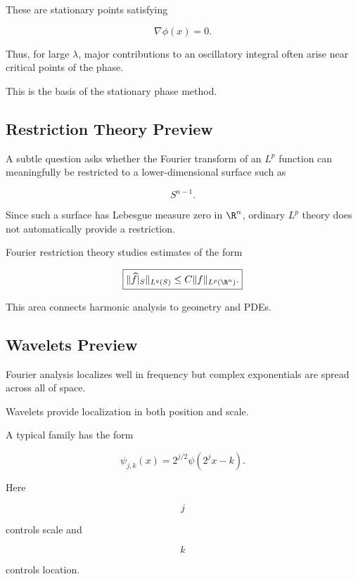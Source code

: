 These are stationary points satisfying

\[
\boxed{
\nabla\phi(x)=0.
}
\]

Thus, for large \(\lambda\), major contributions to an oscillatory
integral often arise near critical points of the phase.

This is the basis of the stationary phase method.

\subsection{Restriction Theory Preview}
\label{subsec:restriction-theory-preview}

A subtle question asks whether the Fourier transform of an \(L^p\)
function can meaningfully be restricted to a lower-dimensional surface
such as

\[
\boxed{
S^{n-1}.
}
\]

Since such a surface has Lebesgue measure zero in \(\R^n\), ordinary
\(L^p\) theory does not automatically provide a restriction.

Fourier restriction theory studies estimates of the form

\[
\boxed{
\|\widehat{f}|_S\|_{L^q(S)}
\leq
C\|f\|_{L^p(\R^n)}.
}
\]

This area connects harmonic analysis to geometry and PDEs.

\subsection{Wavelets Preview}
\label{subsec:wavelets-preview}

Fourier analysis localizes well in frequency but complex exponentials are
spread across all of space.

Wavelets provide localization in both position and scale.

A typical family has the form

\[
\boxed{
\psi_{j,k}(x)
=
2^{j/2}\psi(2^jx-k).
}
\]

Here

\[
j
\]

controls scale and

\[
k
\]

controls location.

